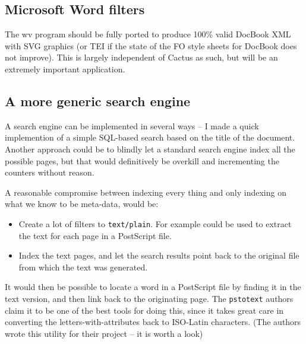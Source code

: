 \subsection*{Microsoft Word filters}

The wv program should be fully ported to produce 100\% valid DocBook XML with SVG
graphics (or TEI if the state of the FO style sheets for DocBook does
not improve).  This is largely independent of Cactus as such, but will
be an extremely important application.


\subsection*{A more generic search engine}

A search engine can be implemented in several ways -- I made a quick
implemention of a simple SQL-based search based on the title of the
document.  Another approach could be to blindly let a standard search
engine index all the possible pages, but that would definitively be
overkill and incrementing the counters without reason.

A reasonable compromise between indexing every thing and only indexing
on what we know to be meta-data, would be:

\begin{itemize}
\item Create a lot of filters to \texttt{text/plain}.  For example
  could
  be used to extract the text for each page in a PostScript file.

\item
  Index the text pages, and let the search results point back to the
  original file from which the text was generated.
\end{itemize}

It would then be possible to locate a word in a PostScript file by
finding it in the text version, and then link back to the originating
page.  The \texttt{pstotext} authors claim it to be one of the best
tools for doing this, since it takes great care in converting the
letters-with-attributes back to ISO-Latin characters.  (The authors
wrote this utility for their
 project -- it is worth a look)













